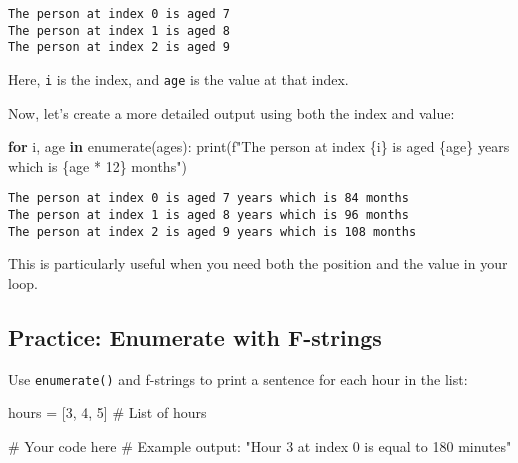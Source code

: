 \documentclass[
  letterpaper,
  DIV=11,
  numbers=noendperiod]{scrreprt}
\newenvironment{Shaded}{\begin{snugshade}}{\end{snugshade}}
\newcommand{\BuiltInTok}[1]{\textcolor[rgb]{0.00,0.23,0.31}{#1}}
\newcommand{\CommentTok}[1]{\textcolor[rgb]{0.37,0.37,0.37}{#1}}
\newcommand{\ControlFlowTok}[1]{\textcolor[rgb]{0.00,0.23,0.31}{\textbf{#1}}}
\newcommand{\DecValTok}[1]{\textcolor[rgb]{0.68,0.00,0.00}{#1}}
\newcommand{\KeywordTok}[1]{\textcolor[rgb]{0.00,0.23,0.31}{\textbf{#1}}}
\newcommand{\NormalTok}[1]{\textcolor[rgb]{0.00,0.23,0.31}{#1}}
\newcommand{\OperatorTok}[1]{\textcolor[rgb]{0.37,0.37,0.37}{#1}}
\newcommand{\SpecialCharTok}[1]{\textcolor[rgb]{0.37,0.37,0.37}{#1}}
\newcommand{\SpecialStringTok}[1]{\textcolor[rgb]{0.13,0.47,0.30}{#1}}
\begin{document}
\begin{verbatim}
The person at index 0 is aged 7
The person at index 1 is aged 8
The person at index 2 is aged 9
\end{verbatim}

Here, \texttt{i} is the index, and \texttt{age} is the value at that
index.

Now, let's create a more detailed output using both the index and value:

\begin{Shaded}
\begin{Highlighting}[]
\ControlFlowTok{for}\NormalTok{ i, age }\KeywordTok{in} \BuiltInTok{enumerate}\NormalTok{(ages):}
    \BuiltInTok{print}\NormalTok{(}\SpecialStringTok{f"The person at index }\SpecialCharTok{\{}\NormalTok{i}\SpecialCharTok{\}}\SpecialStringTok{ is aged }\SpecialCharTok{\{}\NormalTok{age}\SpecialCharTok{\}}\SpecialStringTok{ years which is }\SpecialCharTok{\{}\NormalTok{age }\OperatorTok{*} \DecValTok{12}\SpecialCharTok{\}}\SpecialStringTok{ months"}\NormalTok{)}
\end{Highlighting}
\end{Shaded}

\begin{verbatim}
The person at index 0 is aged 7 years which is 84 months
The person at index 1 is aged 8 years which is 96 months
The person at index 2 is aged 9 years which is 108 months
\end{verbatim}

This is particularly useful when you need both the position and the
value in your loop.

\begin{tcolorbox}[enhanced jigsaw, colframe=quarto-callout-tip-color-frame, opacityback=0, titlerule=0mm, bottomrule=.15mm, breakable, leftrule=.75mm, colbacktitle=quarto-callout-tip-color!10!white, title=\textcolor{quarto-callout-tip-color}{\faLightbulb}\hspace{0.5em}{Practice}, rightrule=.15mm, coltitle=black, opacitybacktitle=0.6, colback=white, left=2mm, arc=.35mm, toptitle=1mm, bottomtitle=1mm, toprule=.15mm]

\subsection{Practice: Enumerate with
F-strings}\label{practice-enumerate-with-f-strings}

Use \texttt{enumerate()} and f-strings to print a sentence for each hour
in the list:

\begin{Shaded}
\begin{Highlighting}[]
\NormalTok{hours }\OperatorTok{=}\NormalTok{ [}\DecValTok{3}\NormalTok{, }\DecValTok{4}\NormalTok{, }\DecValTok{5}\NormalTok{]  }\CommentTok{\# List of hours}

\CommentTok{\# Your code here}
\CommentTok{\# Example output: "Hour 3 at index 0 is equal to 180 minutes"}
\end{Highlighting}
\end{Shaded}

\end{tcolorbox}
\end{document}
